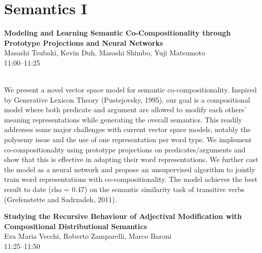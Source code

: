 \documentclass[twoside,makeidx]{book}
\begin{document}
\section{Semantics I}
\vspace{-1em}
\par\vspace{2em}\noindent%
\begin{minipage}{\linewidth}%
\begin{center}
\textbf{\normalsize Modeling and Learning Semantic Co-Compositionality through Prototype Projections and Neural Networks}\\
\normalsize  Masashi Tsubaki,  Kevin Duh,  Masashi Shimbo,  Yuji Matsumoto\\
{\small 11:00--11:25}\\
\end{center}
\end{minipage}\\[0.5em]
\nopagebreak%
\noindent%
{\small We present a novel vector space model for semantic co-compositionality. Inspired by Generative Lexicon Theory (Pustejovsky, 1995), our goal is a compositional model where both predicate and argument are allowed to modify each others' meaning representations while generating the overall semantics. This readily addresses some major challenges with current vector space models, notably the polysemy issue and the use of one representation per word type. We implement co-compositionality using prototype projections on predicates/arguments and show that this is effective in adapting their word representations. We further cast the model as a neural network and propose an unsupervised algorithm to jointly train word representations with co-compositionality. The model achieves the best result to date (rho = 0.47) on the semantic similarity task of transitive verbs (Grefenstette and Sadrzadeh, 2011).}
\par\vspace{2em}\noindent%
\begin{minipage}{\linewidth}%
\begin{center}
\textbf{\normalsize Studying the Recursive Behaviour of Adjectival Modification with Compositional Distributional Semantics}\\
\normalsize  Eva Maria Vecchi,  Roberto Zamparelli,  Marco Baroni\\
{\small 11:25--11:50}\\
\end{center}
\end{minipage}\\[0.5em]
\end{document}
